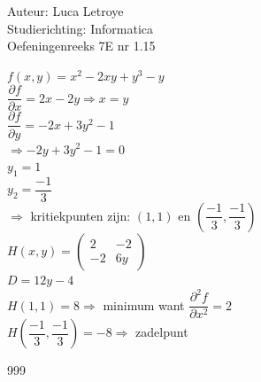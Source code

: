 \documentclass[a4paper]{article}
\begin{document}
  
\noindent \large Auteur: Luca Letroye \\
\noindent \large Studierichting: Informatica\\
\noindent \large Oefeningenreeks 7E nr 1.15\\

\medskip

\normalsize

$f(x,y) = x^2-2xy+y^3-y$\\

$\dfrac{\partial f}{\partial x} = 2x-2y \Rightarrow x=y$\\

$\dfrac{\partial f}{\partial y} = -2x+3y^2-1 $\\

$\Rightarrow -2y+3y^2-1 = 0$\\

$y_1 = 1$\\

$y_2 = \dfrac{-1}{3}$\\

$\Rightarrow $ kritiekpunten zijn: $(1,1) $ en $\left(\dfrac{-1}{3},\dfrac{-1}{3}\right)$ \\

$H(x,y) = \left(\begin{array}{cc}
	2 & -2 \\
	-2 & 6y 
\end{array}\right)$\\

$D = 12y-4 $\\

$H(1,1) = 8 \Rightarrow $ minimum want $\dfrac{\partial^2 f}{\partial x^2} = 2$\\

$H\left(\dfrac{-1}{3},\dfrac{-1}{3}\right) = -8 \Rightarrow $ zadelpunt\\


\begin{thebibliography}{999}
\end{thebibliography}
\end{document}
